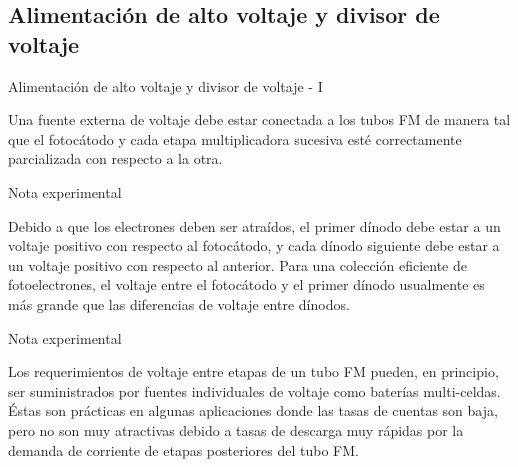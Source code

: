 \documentclass[a4paper,10pt]{beamer}
\begin{document}
\subsection{Alimentación de alto voltaje y divisor de voltaje}
\begin{frame}{Alimentación de alto voltaje y divisor de voltaje - I}
  
 \begin{justify} 
 Una fuente externa de voltaje debe estar conectada a los tubos FM de manera tal que 
 el fotocátodo y cada etapa multiplicadora sucesiva esté correctamente parcializada 
 con respecto a la otra.
 
 \begin{exampleblock}{Nota experimental}
 \begin{justify}
   Debido a que los electrones deben ser atraídos, el primer dínodo debe estar a 
  un voltaje positivo con respecto al fotocátodo, y cada dínodo siguiente debe estar 
  a un voltaje positivo con respecto al anterior. Para una colección eficiente de 
  fotoelectrones, el voltaje entre el fotocátodo y el primer dínodo usualmente 
  es más grande que las diferencias de voltaje entre dínodos.
  \end{justify}
 \end{exampleblock}
 
\begin{exampleblock}{Nota experimental}
 \begin{justify}
  Los requerimientos de voltaje entre etapas de un tubo FM pueden, en principio, 
  ser suministrados por fuentes individuales de voltaje como baterías multi-celdas.
  Éstas son prácticas en algunas aplicaciones donde las tasas de cuentas son baja, pero 
  no son muy atractivas debido a tasas de descarga muy rápidas por la demanda 
  de corriente de etapas posteriores del tubo FM.
  \end{justify}
 \end{exampleblock}
 
 \end{justify}
\end{frame}
\end{document}
